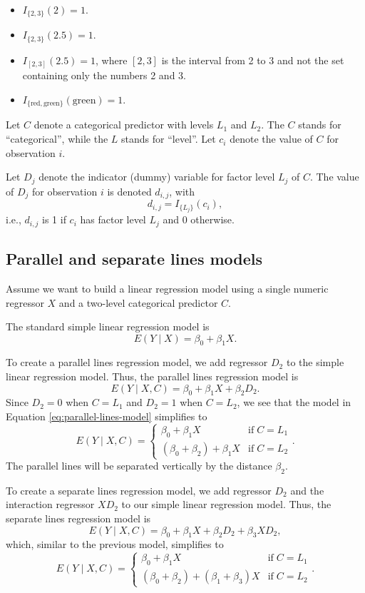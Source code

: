\documentclass[
]{book}
\providecommand{\tightlist}{%
  \setlength{\itemsep}{0pt}\setlength{\parskip}{0pt}}
\theoremstyle{definition}
\theoremstyle{definition}
\theoremstyle{definition}
\theoremstyle{definition}
\theoremstyle{remark}
\begin{document}
\begin{itemize}
\tightlist
\item
  \(I_{\{2,3\}}(2) = 1\).
\item
  \(I_{\{2,3\}}(2.5) = 1\).
\item
  \(I_{[2,3]}(2.5) = 1\), where \([2,3]\) is the interval from 2 to 3 and not the set containing only the numbers 2 and 3.
\item
  \(I_{\{\text{red},\text{green}\}}(\text{green}) = 1\).
\end{itemize}

Let \(C\) denote a categorical predictor with levels \(L_1\) and \(L_2\). The \(C\) stands for ``categorical'', while the \(L\) stands for ``level''. Let \(c_i\) denote the value of \(C\) for observation \(i\).

Let \(D_j\) denote the indicator (dummy) variable for factor level \(L_j\) of \(C\). The value of \(D_j\) for observation \(i\) is denoted \(d_{i,j}\), with
\[
d_{i,j} = I_{\{L_j\}}(c_i),
\]
i.e., \(d_{i,j}\) is 1 if \(c_i\) has factor level \(L_j\) and 0 otherwise.

\hypertarget{parallel-and-separate-lines-models}{%
\subsection{Parallel and separate lines models}\label{parallel-and-separate-lines-models}}

Assume we want to build a linear regression model using a single numeric regressor \(X\) and a two-level categorical predictor \(C\).

The standard simple linear regression model is
\[E(Y\mid X)=\beta_0 + \beta_1 X.\]

To create a parallel lines regression model, we add regressor \(D_2\) to the simple linear regression model. Thus, the parallel lines regression model is
\[
E(Y\mid X,C)=\beta_{0}+\beta_1 X+\beta_2 D_2. \label{eq:parallel-lines-model}
\]
Since \(D_2=0\) when \(C=L_1\) and \(D_2=1\) when \(C=L_2\), we see that the model in Equation \eqref{eq:parallel-lines-model} simplifies to
\[
E(Y\mid X, C) =
\begin{cases}
  \beta_0+\beta_1 X & \mathrm{if}\;C = L_1 \\
  (\beta_0 + \beta_2) +\beta_1 X & \mathrm{if}\;C = L_2
\end{cases}.
\]
The parallel lines will be separated vertically by the distance \(\beta_2\).

To create a separate lines regression model, we add regressor \(D_2\) and the interaction regressor \(X D_2\) to our simple linear regression model. Thus, the separate lines regression model is
\[
E(Y\mid X,C)=\beta_0+\beta_1 X+\beta_2 D_2 + \beta_{3} XD_2,
\]
which, similar to the previous model, simplifies to
\[
E(Y\mid X, C) =
\begin{cases}
  \beta_{0}+\beta_1 X & \mathrm{if}\;C = L_1 \\
  (\beta_{0} + \beta_{2}) +(\beta_1 + \beta_{3}) X & \mathrm{if}\;C = L_2
\end{cases}.
\]
\end{document}
